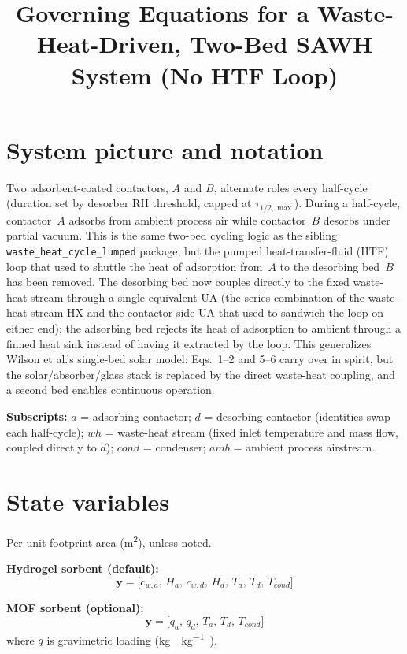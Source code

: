 \documentclass[11pt]{article}
\title{Governing Equations for a Waste-Heat-Driven, Two-Bed SAWH System (No HTF Loop)}
\author{}
\date{}
\begin{document}
\maketitle

\section*{System picture and notation}

Two adsorbent-coated contactors, $A$ and $B$, alternate roles every half-cycle (duration set by desorber RH threshold, capped at $\tau_{1/2,\max}$). During a half-cycle, contactor~$A$ adsorbs from ambient process air while contactor~$B$ desorbs under partial vacuum. This is the same two-bed cycling logic as the sibling \texttt{waste\_heat\_cycle\_lumped} package, but the pumped heat-transfer-fluid (HTF) loop that used to shuttle the heat of adsorption from~$A$ to the desorbing bed~$B$ has been removed. The desorbing bed now couples directly to the fixed waste-heat stream through a single equivalent UA (the series combination of the waste-heat-stream HX and the contactor-side UA that used to sandwich the loop on either end); the adsorbing bed rejects its heat of adsorption to ambient through a finned heat sink instead of having it extracted by the loop. This generalizes Wilson et al.'s single-bed solar model: Eqs.~1--2 and 5--6 carry over in spirit, but the solar/absorber/glass stack is replaced by the direct waste-heat coupling, and a second bed enables continuous operation.

\textbf{Subscripts:} $a$ = adsorbing contactor; $d$ = desorbing contactor (identities swap each half-cycle); $wh$ = waste-heat stream (fixed inlet temperature and mass flow, coupled directly to $d$); $cond$ = condenser; $amb$ = ambient process airstream.

\section{State variables}

Per unit footprint area (\si{\metre\squared}), unless noted.

\textbf{Hydrogel sorbent (default):}
\begin{equation}
\mathbf{y} = \bigl[c_{w,a},\, H_a,\, c_{w,d},\, H_d,\, T_a,\, T_d,\, T_{cond}\bigr]
\end{equation}

\textbf{MOF sorbent (optional):}
\begin{equation}
\mathbf{y} = \bigl[q_a,\, q_d,\, T_a,\, T_d,\, T_{cond}\bigr]
\end{equation}
where $q$ is gravimetric loading (\si{\kilogram\water\per\kilogram\adsorbent}).
\end{document}
